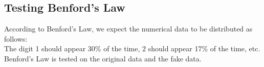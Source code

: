 \documentclass[11pt]{article}
\begin{document}
    \begin{center}
    \end{center}
    
   \subsection{ Testing Benford's Law}

According to Benford's Law, we expect the numerical data to be
distributed as follows:\\

The digit 1 should appear 30\% of the time, 2 should appear 17\% of the
time, etc.\\

Benford's Law is tested on the original data and the fake data.
\end{document}
